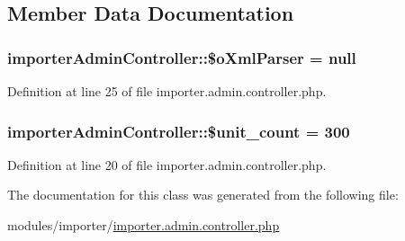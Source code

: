 \subsection{Member Data Documentation}
\hypertarget{classimporterAdminController_a7f08bd88a5e7eeea00c7f201438d1b1b}{
\subsubsection[{\$o\+Xml\+Parser}]{\setlength{\rightskip}{0pt plus 5cm}importer\+Admin\+Controller\+::\$o\+Xml\+Parser = null}}\label{classimporterAdminController_a7f08bd88a5e7eeea00c7f201438d1b1b}


Definition at line 25 of file importer.\+admin.\+controller.\+php.

\hypertarget{classimporterAdminController_ac425370d30482b23546a0a16da75792c}{
\subsubsection[{\$unit\+\_\+count}]{\setlength{\rightskip}{0pt plus 5cm}importer\+Admin\+Controller\+::\$unit\+\_\+count = 300}}\label{classimporterAdminController_ac425370d30482b23546a0a16da75792c}


Definition at line 20 of file importer.\+admin.\+controller.\+php.



The documentation for this class was generated from the following file\+:\begin{DoxyCompactItemize}
\item 
modules/importer/\hyperlink{importer_8admin_8controller_8php}{importer.\+admin.\+controller.\+php}\end{DoxyCompactItemize}
